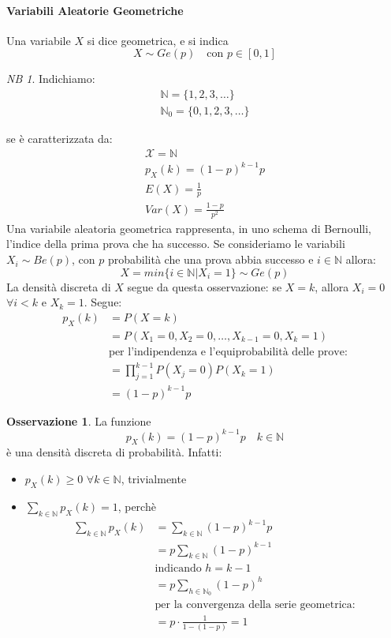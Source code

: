 \documentclass{article}
\theoremstyle{plain}
\theoremstyle{definition}
\newtheorem{osservazione}{Osservazione}[section]
\theoremstyle{remark}
\newtheorem*{NB}{NB}
\begin{document}
\paragraph{Variabili Aleatorie Geometriche} %
\label{par:variabili_aleatorie_geometriche}
Una variabile $X$ si dice geometrica, e si indica
\begin{equation*}
	X\sim Ge(p)\quad\text{con }p\in[0,1]
\end{equation*}
\begin{NB}
	Indichiamo:
	\begin{align*}
		\mathds{N}=\{1,2,3,\dots\}\\
		\mathds{N}_0=\{0,1,2,3,\dots\}
	\end{align*}
\end{NB}
se è caratterizzata da:
\begin{align*}
	\mathcal{X}=\mathds{N}\\
	p_X(k)=(1-p)^{k-1}p\\
	E(X)=\frac{1}{p}\\
	Var(X)=\frac{1-p}{p^2}
\end{align*}
Una variabile aleatoria geometrica rappresenta, in uno schema di Bernoulli, l'indice della prima prova che ha successo. Se consideriamo le variabili $X_i\sim Be(p)$, con $p$ probabilità che una prova abbia successo e $i\in\mathds{N}$ allora:
\begin{equation*}
	X=min\{i\in\mathds{N}|X_i=1\}\sim Ge(p)
\end{equation*}
La densità discreta di $X$ segue da questa osservazione: se $X=k$, allora $X_i=0$ $\forall i<k$ e $X_k=1$. Segue:
\begin{align*}
	p_X(k)&=P(X=k)\\
	&=P(X_1=0, X_2=0,\dots, X_{k-1}=0, X_k=1)\\
	&\text{per l'indipendenza e l'equiprobabilità delle prove:}\\
	&=\prod_{j=1}^{k-1} P(X_j=0)P(X_k=1)\\
	&=(1-p)^{k-1}p
\end{align*}
\begin{osservazione}
	La funzione
	\begin{equation*}
		p_X(k)=(1-p)^{k-1}p\quad k\in\mathds{N}
	\end{equation*}
	è una densità discreta di probabilità. Infatti:
	\begin{itemize}
		\item $p_X(k)\geq0$ $\forall k\in\mathds{N}$, trivialmente
		\item $\sum_{k\in\mathds{N}}p_X(k)=1$, perchè
		\begin{align*}
			\sum_{k\in\mathds{N}}p_X(k)&=\sum_{k\in\mathds{N}}(1-p)^{k-1}p\\
			&=p\sum_{k\in\mathds{N}}(1-p)^{k-1}\\
			&\text{indicando }h=k-1\\
			&=p\sum_{h\in\mathds{N}_0}(1-p)^h\\
			&\text{per la convergenza della serie geometrica:}\\
			&=p\cdot\frac{1}{1-(1-p)}=1
		\end{align*}
	\end{itemize}
\end{osservazione}
\end{document}
